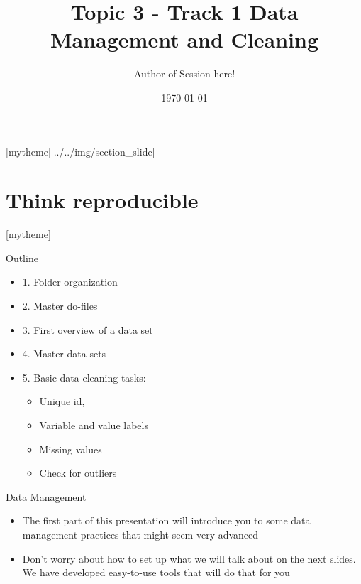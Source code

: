 \documentclass[aspectratio=169]{beamer}
\title{Topic 3 - Track 1 \newline Data Management and Cleaning}
\date{\today}
\author{Author of Session here!} %
\institute{Development Impact Evaluation (DIME) \newline The World Bank }
\newcommand{\sectionpic}[2]{
	\setbeamertemplate{section page}[mytheme][#2]
	\section{#1}
	\setbeamertemplate{section page}[mytheme]
}
\begin{document}
{
	\maketitle
}

\sectionpic{Think reproducible}{../../img/section_slide}


\begin{frame}{Outline}
	\begin{itemize}
		\item 1. Folder organization
		\item 2. Master do-files
		\item 3. First overview of a data set
		\item 4. Master data sets
		\item 5. Basic data cleaning tasks:
			\begin{itemize}
				\item Unique id,
				\item Variable and value labels
				\item Missing values
				\item Check for outliers
			\end{itemize}
	\end{itemize}
\end{frame}


\begin{frame}{Data Management}
	\begin{itemize}
		\item The first part of this presentation will introduce you to some data management practices that might seem very advanced
		\item Don’t worry about how to set up what we will talk about on the next slides. We have developed easy-to-use tools that will do that for you
	\end{itemize}
\end{frame}
\end{document}
